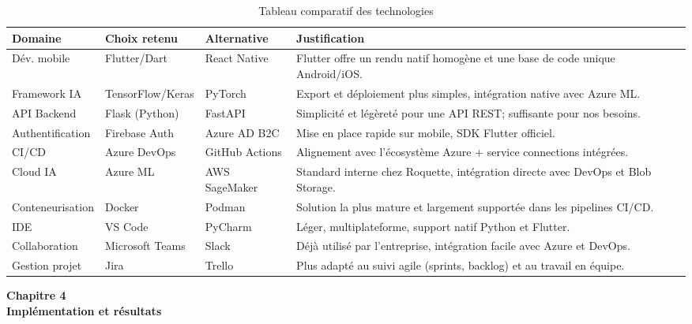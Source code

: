 \documentclass[12pt,a4paper]{report}
\begin{document}
\begin{table}[H]
\centering
\small
\begin{tabular}{|p{3.5cm}|p{3.5cm}|p{3.5cm}|p{5.2cm}|}
\hline
\textbf{Domaine} & \textbf{Choix retenu} & \textbf{Alternative} & \textbf{Justification} \\
\hline
Dév. mobile & Flutter/Dart & React Native & Flutter offre un rendu natif homogène et une base de code unique Android/iOS. \\
\hline
Framework IA & TensorFlow/Keras & PyTorch & Export et déploiement plus simples, intégration native avec Azure ML. \\
\hline
API Backend & Flask (Python) & FastAPI & Simplicité et légèreté pour une API REST\@; suffisante pour nos besoins. \\
\hline
Authentification & Firebase Auth & Azure AD B2C & Mise en place rapide sur mobile, SDK Flutter officiel. \\
\hline
CI/CD & Azure DevOps & GitHub Actions & Alignement avec l’écosystème Azure + service connections intégrées. \\
\hline
Cloud IA & Azure ML & AWS SageMaker & Standard interne chez Roquette, intégration directe avec DevOps et Blob Storage. \\
\hline
Conteneurisation & Docker & Podman & Solution la plus mature et largement supportée dans les pipelines CI/CD. \\
\hline
IDE & VS Code & PyCharm & Léger, multiplateforme, support natif Python et Flutter. \\
\hline
Collaboration & Microsoft Teams & Slack & Déjà utilisé par l’entreprise, intégration facile avec Azure et DevOps. \\
\hline
Gestion projet & Jira & Trello & Plus adapté au suivi agile (sprints, backlog) et au travail en équipe. \\
\hline
\end{tabular}
\caption{Tableau comparatif des technologies}
\label{tab:benchmarking}
\end{table}
\cleardoublepage
\thispagestyle{empty}
\begin{center}
    \vspace*{4cm}
    {\Huge \textbf{Chapitre 4}}\\[1.5cm]
    {\LARGE \textbf{Implémentation et résultats}}
\end{center}
\cleardoublepage

\setcounter{section}{0}
\end{document}
